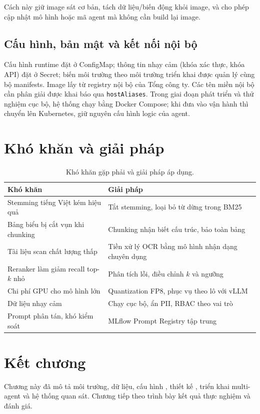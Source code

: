 Cách này giữ image sát cơ bản, tách dữ liệu/biến động khỏi image, và cho phép cập nhật mô
hình hoặc mã agent mà không cần build lại image.

\subsection{Cấu hình, bản mật và kết nối nội bộ}

Cấu hình runtime đặt ở ConfigMap; thông tin nhạy cảm (khóa xác thực, khóa API) đặt ở
Secret; biến môi trường theo môi trường triển khai được quản lý cùng bộ manifests. Image
lấy từ registry nội bộ của Tổng công ty. Các tên miền nội bộ cần phân giải được khai báo
qua \texttt{hostAliases}. Trong giai đoạn phát triển và thử nghiệm cục bộ, hệ thống chạy
bằng Docker Compose; khi đưa vào vận hành thì chuyển lên Kubernetes, giữ nguyên cấu hình
logic của agent.

\section{Khó khăn và giải pháp}
\label{sec:khokhan}

\begin{table}[htbp]
\centering
\caption{Khó khăn gặp phải và giải pháp áp dụng.}
\label{tab:khokhan}
\small
\begin{tabular}{@{}p{5.2cm}p{9.2cm}@{}}
\toprule
\textbf{Khó khăn} & \textbf{Giải pháp} \\
\midrule
Stemming tiếng Việt kém hiệu quả & Tắt stemming, loại bỏ từ dừng trong BM25 \\
Bảng biểu bị cắt vụn khi chunking & Chunking nhận biết cấu trúc, bảo toàn bảng \\
Tài liệu scan chất lượng thấp & Tiền xử lý OCR bằng mô hình nhận dạng chuyên dụng \\
Reranker làm giảm recall top-$k$ nhỏ & Phân tích lỗi, điều chỉnh $k$ và ngưỡng \\
Chi phí GPU cho mô hình lớn & Quantization FP8, phục vụ theo lô với vLLM \\
Dữ liệu nhạy cảm & Chạy cục bộ, ẩn PII, RBAC theo vai trò \\
Prompt phân tán, khó kiểm soát & MLflow Prompt Registry tập trung \\
\bottomrule
\end{tabular}
\end{table}

\section*{Kết chương}
Chương này đã mô tả môi trường, dữ liệu, cấu hình \rag, thiết kế \ft, triển khai multi-agent
và hệ thống quan sát. Chương tiếp theo trình bày kết quả thực nghiệm và đánh giá.
